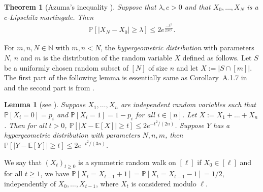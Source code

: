 \documentclass[a4paper, 11pt, reqno]{amsart}
\newtheorem{theorem}[definition]{Theorem}
\newtheorem{lemma}[definition]{Lemma}
\numberwithin{equation}{section}
\newcommand{\1}{{\rm 1\hspace*{-0.4ex}%
\rule{0.1ex}{1.52ex}\hspace*{0.2ex}}}
\newcommand{\Pro}{\mathbb{P}}
\newcommand{\Exp}{\mathbb{E}}
\newcommand{\COMMENT}[1]{}
\begin{document}
\begin{theorem}[Azuma's inequality \cite{Azu67, Hoe63}]\label{Azuma} 
Suppose that $\lambda, c >0$ and that $X_0,\dots, X_N$ is a $c$-Lipschitz martingale. 
Then 
\begin{align*}
\mathbb{P}[\left|X_N-X_0\right|\geq \lambda]\leq 2e^{\frac{-\lambda^2}{2Nc^2}}.
\end{align*}
\end{theorem}


For $m,n,N\in \mathbb{N}$ with $m,n<N$, 
the \emph{hypergeometric distribution} with parameters $N$, $n$ and $m$ is the distribution of the random variable $X$ defined as follows. 
Let $S$ be a uniformly chosen random subset of $[N]$ of size $n$ and let $X:=|S\cap [m]|$. 
The first part of the following lemma is essentially same as Corollary~A.1.7 in~\cite{AS08} and the second part is from \cite{HS05}.

\begin{lemma}%
[see {\cite{AS08, HS05}}] \label{lem: chernoff} 
Suppose $X_1,\dots, X_n$ are independent random variables such that $\mathbb{P}[X_i=0]=p_i$ and $\mathbb{P}[X_i=1]=1-p_i$ for all $i\in [n]$. Let $X:= X_1+\dots + X_n$. Then for all $t>0$, $\mathbb{P}[|X - \mathbb{E}[X]| \geq t] \leq 2e^{-t^2/(2n)}$. 
Suppose $Y$ has a hypergeometric distribution with parameters $N,n,m$,
then
$\mathbb{P}[|Y - \mathbb{E}[Y]| \geq t] \leq 2e^{-t^2/(3n)}$.
\end{lemma}






We say that $(X_t)_{t\geq 0}$ is a symmetric random walk on $[\ell]$ if $X_0\in [\ell]$ and for all $t\geq 1$,
we have $\mathbb{P}[X_{t}=X_{t-1}+1]=\mathbb{P}[X_{t}=X_{t-1}-1]=1/2$,
independently of $X_0,\ldots,X_{t-1}$,  where $X_t$ is considered modulo $\ell$. 
\end{document}
